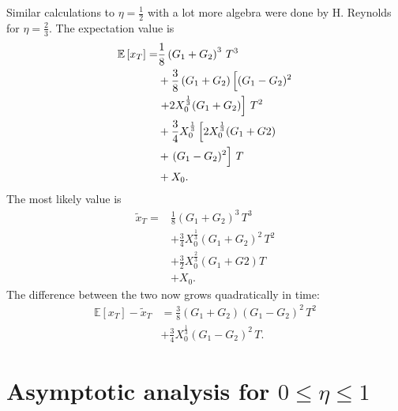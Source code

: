 \documentclass[11pt]{article}
\begin{document}
\begin{multicols}{2}
Similar calculations to $\eta=\frac{1}{2}$ with a lot more algebra were done by H. Reynolds for $\eta = \frac{2}{3}$. 
The expectation value is
\begin{align}
\label{eq:expectationExact2} \mathbb{E}\left[x_T\right] =& \frac{1}{8}\left( G_1+G_2\right)^3\,T^3 \\
\nonumber &+ \frac{3}{8} \left(G_1+G_2\right) \left[(G_1-G_2)^2 \vphantom{X_0^\frac{1}{3} }  \right.\\
\nonumber & \left.+ 2 X_0^\frac{1}{3} (G_1+G_2)\right]\,T^2\\
\nonumber & + \frac{3}{4} X_0^\frac{1}{3} \left[2 X_0^\frac{1}{3} (G_1+G2) \right.\\
\nonumber & + \left.(G_1-G_2)^2  \vphantom{X_0^\frac{1}{3} } \right]\,T\\
\nonumber &+ X_0.
\end{align}
The most likely value is
\begin{align}
\label{eq:mostLikely2} \widetilde{x}_T =& \frac{1}{8}\left( G_1+G_2\right)^3\,T^3 \\
\nonumber &+ \frac{3}{4} X_0^\frac{1}{3} (G_1+G_2)^2\,T^2\\
\nonumber & + \frac{3}{2} X_0^\frac{2}{3}  (G_1+G2) T\\
\nonumber &+ X_0.
\end{align}
The difference between the two now grows quadratically in time:
\begin{align}
\label{eq:difference2}\mathbb{E}\left[x_T \right] -  \widetilde{x}_T &= \frac{3}{8} (G_1+G_2)(G_1-G_2)^2\, T^2\\
\nonumber&+ \frac{3}{4} X_0^\frac{1}{3} (G_1-G_2)^2\,T.
\end{align}
\end{multicols}

\section{Asymptotic analysis for $ 0 \leq \eta \leq 1$}
\end{document}
